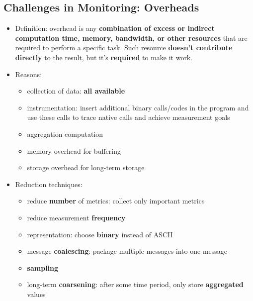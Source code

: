 \subsection{Challenges in Monitoring: Overheads}
\begin{itemize}
	\item Definition: overhead is any \textbf{combination of excess or indirect computation time, memory, bandwidth, or other resources} that are required to perform a specific task.  Such resource \textbf{doesn't contribute directly} to the result, but it's \textbf{required} to make it work.
	
	\item Reasons: 
	\begin{itemize}
		\item collection of data: \textbf{all available}
		\item instrumentation: insert additional binary calls/codes in the program and use these calls to trace native calls and achieve measurement goals
		\item aggregation computation
		\item memory overhead for buffering
		\item storage overhead for long-term storage
	\end{itemize}
	
	
	
	\item Reduction techniques: 
	\begin{itemize}
		\item reduce \textbf{number} of metrics: collect only important metrics
		\item reduce measurement \textbf{frequency}
		\item representation: choose \textbf{binary} instead of ASCII
		\item message \textbf{coalescing}: package multiple messages into one message
		\item \textbf{sampling}
		\item long-term \textbf{coarsening}: after some time period, only store \textbf{aggregated} values
	\end{itemize}
\end{itemize}




